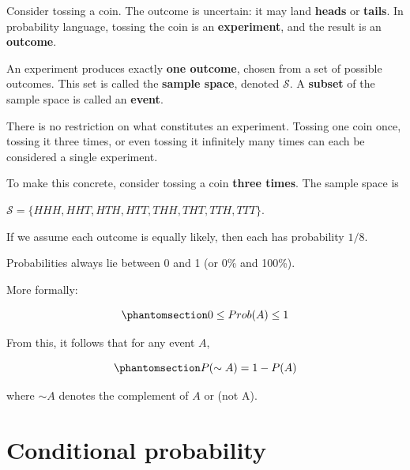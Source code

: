 \documentclass[
  letterpaper,
  DIV=11,
  numbers=noendperiod]{scrreprt}
\begin{document}
Consider tossing a coin. The outcome is uncertain: it may land
\textbf{heads} or \textbf{tails}. In probability language, tossing the
coin is an \textbf{experiment}, and the result is an \textbf{outcome}.

An experiment produces exactly \textbf{one outcome}, chosen from a set
of possible outcomes. This set is called the \textbf{sample space},
denoted \(\mathcal{S}\). A \textbf{subset} of the sample space is called
an \textbf{event}.

There is no restriction on what constitutes an experiment. Tossing one
coin once, tossing it three times, or even tossing it infinitely many
times can each be considered a single experiment.

To make this concrete, consider tossing a coin \textbf{three times}. The
sample space is

\(\mathcal{S} = \{HHH, HHT, HTH, HTT, THH, THT, TTH, TTT\}\).

If we assume each outcome is equally likely, then each has probability
\(1/8\).

\begin{tcolorbox}[enhanced jigsaw, coltitle=black, colbacktitle=quarto-callout-important-color!10!white, left=2mm, bottomrule=.15mm, bottomtitle=1mm, colback=white, titlerule=0mm, colframe=quarto-callout-important-color-frame, breakable, leftrule=.75mm, toptitle=1mm, opacitybacktitle=0.6, rightrule=.15mm, title=\textcolor{quarto-callout-important-color}{\faExclamation}\hspace{0.5em}{A basic fact}, arc=.35mm, opacityback=0, toprule=.15mm]

Probabilities always lie between 0 and 1 (or 0\% and 100\%).

More formally:

\begin{equation}\phantomsection\label{eq-probrule-1}{
0 \leq Prob(A) \leq 1
}\end{equation}

\end{tcolorbox}

From this, it follows that for any event \(A\),

\begin{equation}\phantomsection\label{eq-probrule-2}{
P(\sim A) = 1 - P(A)
}\end{equation}

where \(\sim A\) denotes the complement of \(A\) or (not A).

\section{Conditional probability}\label{conditional-probability}
\end{document}
